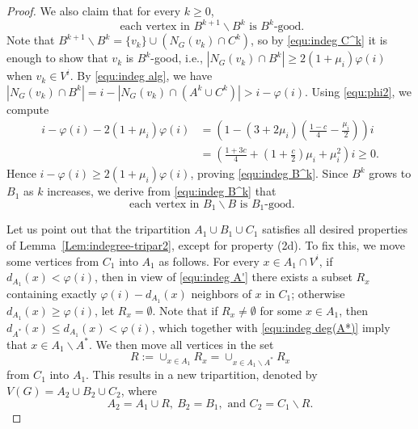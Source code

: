 \documentclass{aic}
\begin{document}
\begin{proof}
		We also claim that for every $k\geq 0$,
		\begin{equation}
			\label{equ:indeg B^k}
			\text{ each vertex in } B^{k+1}\backslash B^k \text{ is } B^k\text{-good}.
		\end{equation}
		Note that $B^{k+1}\backslash B^k =\{v_k\}\cup (N_G(v_k)\cap C^k)$, so by \eqref{equ:indeg C^k}
		it is enough to show that $v_k$ is $B^k$-good, i.e., $|N_{G}(v_k)\cap B^k|\geq 2(1+\mu_i)\varphi(i)$ when $v_k\in V^i$.
		By \eqref{equ:indeg alg}, we have $|N_G(v_k)\cap B^k|=i-|N_G(v_k)\cap (A^k\cup C^k)|> i-\varphi(i)$.
		Using \eqref{equ:phi2}, we compute
		\begin{align*}
			i-\varphi(i)-2(1+\mu_i)\varphi(i)
			&=\left(1-(3+2\mu_i)\left(\frac{1-c}{4}-\frac{\mu_i}{2}\right)\right)i\\
			&=\left(\frac{1+3c}{4}+\left(1+\frac{c}{2}\right)\mu_i+\mu_i^2\right)i\ge 0.
		\end{align*}
		Hence $i-\varphi(i)\ge 2(1+\mu_i)\varphi(i)$, proving \eqref{equ:indeg B^k}.
		Since $B^k$ grows to $B_1$ as $k$ increases, we derive from \eqref{equ:indeg B^k} that
		\begin{equation}
			\label{equ:indeg B-good}
			\text{ each vertex in } B_1\backslash B \text{ is } B_1\text{-good}.
		\end{equation}
		
		
		\medskip
		
		Let us point out that the tripartition $A_1 \cup B_1 \cup C_1$ satisfies all desired properties of Lemma~\ref{Lem:indegree-tripar2}, except for property (2d).
		To fix this, we move some vertices from $C_1$ into $A_1$ as follows.
		For every $x\in A_1\cap V^i$,
		if $d_{A_1}(x)<\varphi(i)$, then in view of \eqref{equ:indeg A'} there exists a subset $R_x$
		containing exactly $\varphi(i)-d_{A_1}(x)$ neighbors of $x$ in $C_1$;
		otherwise $d_{A_1}(x)\geq \varphi(i)$, let $R_x=\emptyset$.
		Note that if $R_x\neq \emptyset$ for some $x\in A_1$, then $d_{A^*}(x)\le d_{A_1}(x)<\varphi(i)$,
		which together with \eqref{equ:indeg deg(A*)} imply that $x\in A_1\backslash A^*$.
		We then move all vertices in the set
		\begin{equation}\label{equ:indeg R}
			R:=\cup_{x\in A_1} R_x=\cup_{x\in A_1\backslash A^*} R_x
		\end{equation}
		from $C_1$ into $A_1$.
		This results in a new tripartition, denoted by $V(G)=A_2\cup B_2\cup C_2$, where
		$$A_2=A_1\cup R,~ B_2=B_1, \text{ and } C_2=C_1\backslash R.$$
		

\end{proof}
\end{document}

